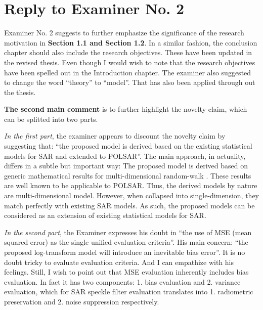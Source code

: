 \section*{Reply to Examiner No. 2}

\begin{replyheader}
\end{replyheader}  

Examiner No. 2 suggests to further emphasize the significance of the research motivation in \textbf{Section 1.1 and Section 1.2}.
In a similar fashion, the conclusion chapter should also include the research objectives.
These have been updated in the revised thesis.
Even though I would wish to note that the research objectives have been spelled out in the Introduction chapter.
The examiner also suggested to change the word ``theory'' to ``model''.
That has also been applied through out the thesis.

\textbf{The second main comment} is to further highlight the novelty claim, which can be splitted into two parts.

\textit{In the first part}, the examiner appears to discount the novelty claim by suggesting that:
 ``the proposed model is derived based on the existing statistical models for SAR and extended to POLSAR''.
The main approach, in actuality, differs in a subtle but important way:
The proposed model is derived based on generic mathematical results for multi-dimensional random-walk \cite{Goodman_JOptSocAm_76, Goodman_Springer_1975}.
These results are well known to be applicable to POLSAR.
Thus, the derived models by nature are multi-dimensional model.
However, when collapsed into single-dimension, they match perfectly with existing SAR models.
As such, the proposed models can be considered as an extension of existing statistical models for SAR.

\textit{In the second part}, the Examiner expresses his doubt in ``the use of MSE (mean squared error) as the single unified evaluation criteria''.
His main concern: ``the proposed log-transform model will introduce an inevitable bias error''.
It is no doubt tricky to evaluate evaluation criteria.
And I can empathize with his feelings.
Still, I wish to point out that MSE evaluation inherently includes bias evaluation. 
In fact it has two components: 1. bias evaluation and 2. variance evaluation, which for SAR speckle filter evaluation translates into 1. radiometric preservation and 2. noise suppression respectively.


